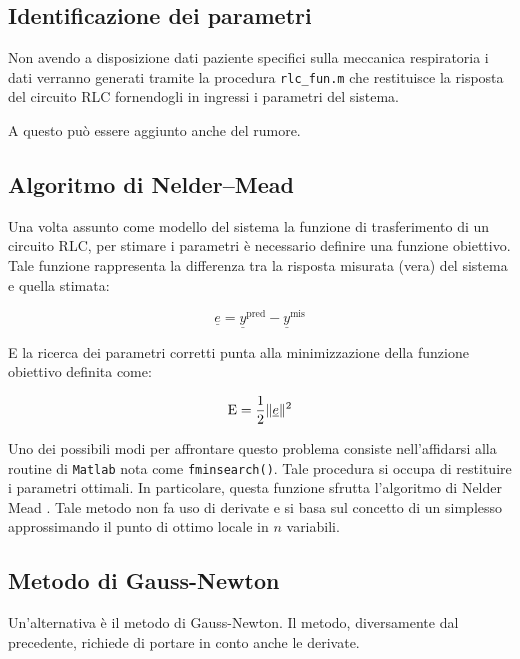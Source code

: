 \subsection{Identificazione dei parametri}

Non avendo a disposizione dati paziente specifici sulla meccanica respiratoria i dati verranno generati tramite la procedura \texttt{rlc\_fun.m} che restituisce la risposta del circuito RLC fornendogli in ingressi i parametri del sistema. 

A questo può essere aggiunto anche del rumore.

\subsection{Algoritmo di Nelder–Mead}

Una volta assunto come modello del sistema la funzione di trasferimento di un circuito RLC, per stimare i parametri è necessario definire una funzione obiettivo. Tale funzione rappresenta la differenza tra la risposta misurata (vera) del sistema e quella stimata:

\begin{equation}
\underline e=\underline y^{\operatorname{pred}} - \underline y^{\operatorname{mis}}
\end{equation}

E la ricerca dei parametri corretti punta alla minimizzazione della funzione obiettivo definita come:

\begin{equation}
 \mathrm{E}={1\over 2} \|\underline e\|^2
 \label{eq:obj}
\end{equation}

Uno dei possibili modi per affrontare questo problema consiste nell'affidarsi alla routine di \texttt{Matlab} nota come \texttt{fminsearch()}. Tale procedura si occupa di restituire i parametri ottimali. In particolare, questa funzione sfrutta l'algoritmo di Nelder Mead \cite{lagarias_convergence_1998}. Tale metodo non fa uso di derivate e si basa sul concetto di un simplesso approssimando il punto di ottimo locale in $n$ variabili. 


\subsection{Metodo di Gauss-Newton}

Un'alternativa è il metodo di Gauss-Newton. Il metodo, diversamente dal precedente, richiede di portare in conto anche le derivate. 

